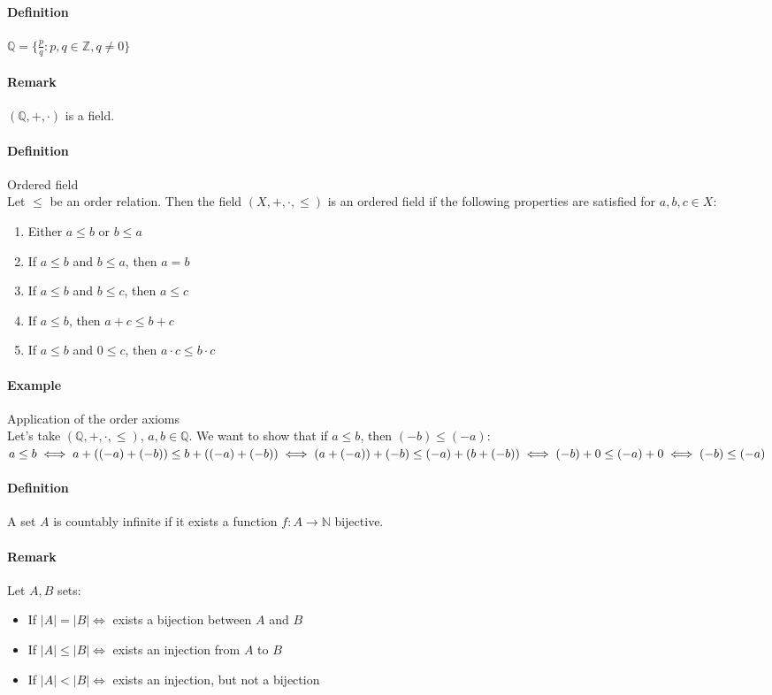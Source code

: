\documentclass{article}
\newcommand{\functoN}[2]{#1 : #2 \rightarrow \mathbb{N}}
\newcommand{\Z}{\mathbb{Z}}
\newcommand{\Q}{\mathbb{Q}}
\newcommand{\Def}{\paragraph{Definition}}
\newcommand{\Remark}{\paragraph{Remark}}
\newcommand{\Example}{\paragraph{Example}}
\begin{document}
  \Def $\Q = \{ \frac{p}{q} : p, q \in \Z, q \neq 0 \}$

  \Remark $(\Q, +, \cdot)$ is a field.

  \Def Ordered field
\\Let $\leq$ be an order relation. Then the field $(X, +, \cdot, \leq)$ is an
  ordered field if the following properties are satisfied for $a, b, c\in X$:
  \begin{enumerate}[label=(\roman*)]
    \item Either $a \leq b$ or $b \leq a$

    \item If $a \leq b$ and $b \leq a$, then $a = b$

    \item If $a \leq b$ and $b \leq c$, then $a \leq c$

    \item If $a \leq b$, then $a + c \leq b + c$

    \item If $a \leq b$ and $0 \leq c$, then $a \cdot c \leq b \cdot c$
  \end{enumerate}

  \Example Application of the order axioms
\\Let's take $(\Q, +, \cdot, \leq)$, $a, b \in \Q$. We want to show that if $a
  \leq b$, then $(-b) \leq (-a)$:
\\$a \leq b \iff a + ((-a) + (-b)) \leq b + ((-a) + (-b)) \iff (a + (-a)) + (-b)
   \leq (-a) + (b + (-b))
\\\iff (-b) + 0 \leq (-a) + 0 \iff (-b) \leq (-a)$

  \Def A set $A$ is countably infinite if it exists a function
  $\functoN{f}{A}$ bijective.

  \Remark Let $A, B$ sets:
  \begin{itemize}
    \item If $|A| = |B| \iff$ exists a bijection between $A$ and $B$

    \item If $|A| \leq |B| \iff$ exists an injection from $A$ to $B$

    \item If $|A| < |B| \iff$ exists an injection, but not a bijection
  \end{itemize}
\end{document}
